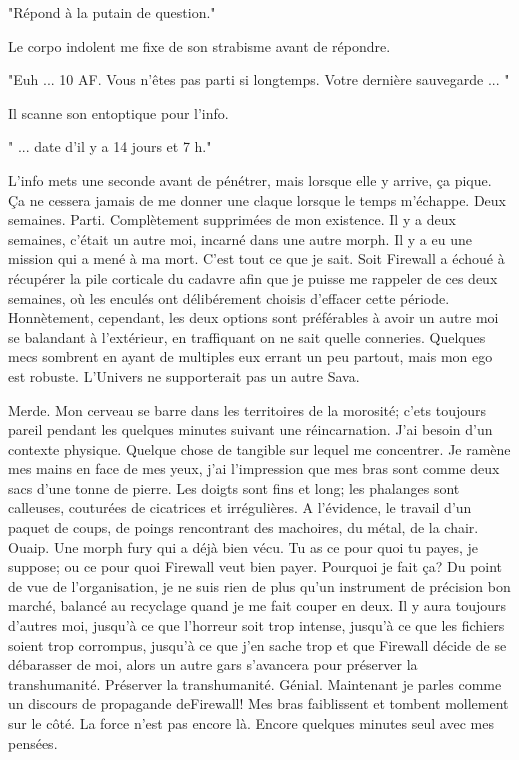 "Répond à la putain de question." 

Le corpo indolent me fixe de son strabisme avant de répondre. 

"Euh ... 10 AF. Vous n'êtes pas parti si longtemps. Votre dernière sauvegarde ... " 

Il scanne son entoptique pour l'info. 

" ... date d'il y a 14 jours et 7 h." 

L'info mets une seconde avant de pénétrer, mais lorsque elle y arrive, ça pique. Ça ne cessera jamais de me donner une claque lorsque le temps m'échappe. Deux semaines. Parti. Complètement supprimées de mon existence. Il y a deux semaines, c'était un autre moi, incarné dans une autre morph. Il y a eu une mission qui a mené à ma mort. C'est tout ce que je sait. Soit Firewall a échoué à récupérer la pile corticale du cadavre afin que je puisse me rappeler de ces deux semaines, où les enculés ont délibérement choisis d'effacer cette période. Honnètement, cependant, les deux options sont préférables à avoir un autre moi se balandant à l'extérieur, en traffiquant on ne sait quelle conneries. Quelques mecs sombrent en ayant de multiples eux errant un peu partout, mais mon ego est robuste. L'Univers ne supporterait pas un autre Sava. 

Merde. Mon cerveau se barre dans les territoires de la morosité; c'ets toujours pareil pendant les quelques minutes suivant une réincarnation. J'ai besoin d'un contexte physique. Quelque chose de tangible sur lequel me concentrer. Je ramène mes mains en face de mes yeux, j'ai l'impression que mes bras sont comme deux sacs d'une tonne de pierre. Les doigts sont fins et long; les phalanges sont calleuses, couturées de cicatrices et irrégulières. A l'évidence, le travail d'un paquet de coups, de poings rencontrant des machoires, du métal, de la chair. Ouaip. Une morph fury qui a déjà bien vécu. Tu as ce pour quoi tu payes, je suppose; ou ce pour quoi Firewall veut bien payer. Pourquoi je fait ça? Du point de vue de l'organisation, je ne suis rien de plus qu'un instrument de précision bon marché, balancé au recyclage quand je me fait couper en deux. Il y aura toujours d'autres moi, jusqu'à ce que l'horreur soit trop intense, jusqu'à ce que les fichiers soient trop corrompus, jusqu'à ce que j'en sache trop et que Firewall décide de se débarasser de moi, alors un autre gars s'avancera pour préserver la transhumanité. Préserver la transhumanité. Génial. Maintenant je parles comme un discours de propagande deFirewall! Mes bras faiblissent et tombent mollement sur le côté. La force n'est pas encore là. Encore quelques minutes seul avec mes pensées. 

